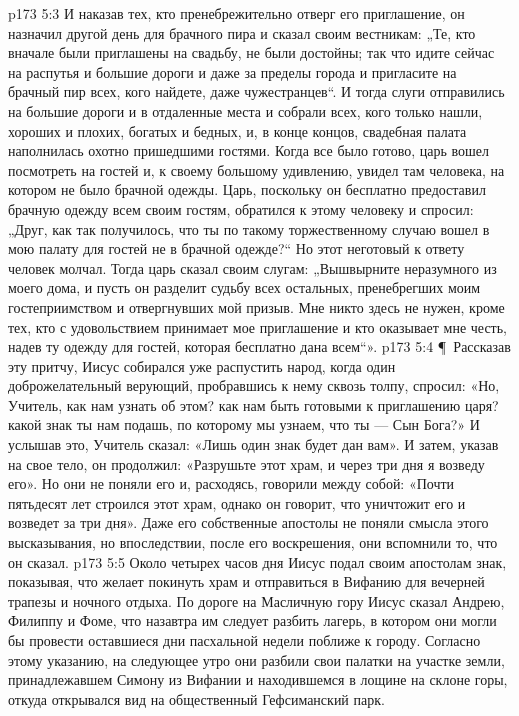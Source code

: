 \vs p173 5:3 И наказав тех, кто пренебрежительно отверг его приглашение, он назначил другой день для брачного пира и сказал своим вестникам: „Те, кто вначале были приглашены на свадьбу, не были достойны; так что идите сейчас на распутья и большие дороги и даже за пределы города и пригласите на брачный пир всех, кого найдете, даже чужестранцев“. И тогда слуги отправились на большие дороги и в отдаленные места и собрали всех, кого только нашли, хороших и плохих, богатых и бедных, и, в конце концов, свадебная палата наполнилась охотно пришедшими гостями. Когда все было готово, царь вошел посмотреть на гостей и, к своему большому удивлению, увидел там человека, на котором не было брачной одежды. Царь, поскольку он бесплатно предоставил брачную одежду всем своим гостям, обратился к этому человеку и спросил: „Друг, как так получилось, что ты по такому торжественному случаю вошел в мою палату для гостей не в брачной одежде?“ Но этот неготовый к ответу человек молчал. Тогда царь сказал своим слугам: „Вышвырните неразумного из моего дома, и пусть он разделит судьбу всех остальных, пренебрегших моим гостеприимством и отвергнувших мой призыв. Мне никто здесь не нужен, кроме тех, кто с удовольствием принимает мое приглашение и кто оказывает мне честь, надев ту одежду для гостей, которая бесплатно дана всем“».
\vs p173 5:4 \P\ Рассказав эту притчу, Иисус собирался уже распустить народ, когда один доброжелательный верующий, пробравшись к нему сквозь толпу, спросил: «Но, Учитель, как нам узнать об этом? как нам быть готовыми к приглашению царя? какой знак ты нам подашь, по которому мы узнаем, что ты --- Сын Бога?» И услышав это, Учитель сказал: «Лишь один знак будет дан вам». И затем, указав на свое тело, он продолжил: «Разрушьте этот храм, и через три дня я возведу его». Но они не поняли его и, расходясь, говорили между собой: «Почти пятьдесят лет строился этот храм, однако он говорит, что уничтожит его и возведет за три дня». Даже его собственные апостолы не поняли смысла этого высказывания, но впоследствии, после его воскрешения, они вспомнили то, что он сказал.
\vs p173 5:5 Около четырех часов дня Иисус подал своим апостолам знак, показывая, что желает покинуть храм и отправиться в Вифанию для вечерней трапезы и ночного отдыха. По дороге на Масличную гору Иисус сказал Андрею, Филиппу и Фоме, что назавтра им следует разбить лагерь, в котором они могли бы провести оставшиеся дни пасхальной недели поближе к городу. Согласно этому указанию, на следующее утро они разбили свои палатки на участке земли, принадлежавшем Симону из Вифании и находившемся в лощине на склоне горы, откуда открывался вид на общественный Гефсиманский парк.
